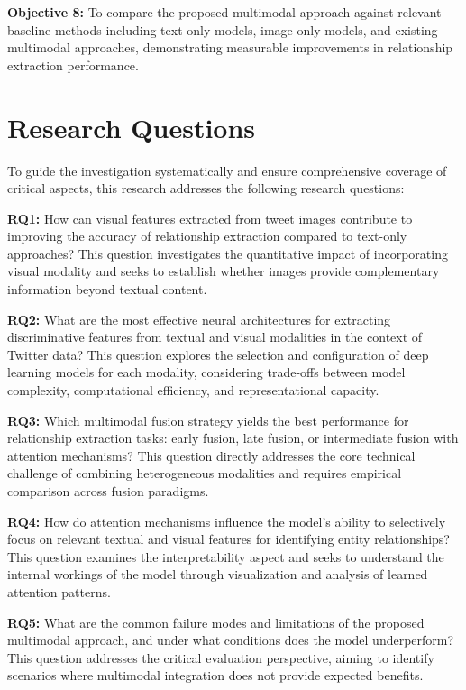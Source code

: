 \documentclass[12pt,a4paper]{report}
\begin{document}
\textbf{Objective 8:} To compare the proposed multimodal approach against relevant baseline methods including text-only models, image-only models, and existing multimodal approaches, demonstrating measurable improvements in relationship extraction performance.

\section{Research Questions}

To guide the investigation systematically and ensure comprehensive coverage of critical aspects, this research addresses the following research questions:

\textbf{RQ1:} How can visual features extracted from tweet images contribute to improving the accuracy of relationship extraction compared to text-only approaches? This question investigates the quantitative impact of incorporating visual modality and seeks to establish whether images provide complementary information beyond textual content.

\textbf{RQ2:} What are the most effective neural architectures for extracting discriminative features from textual and visual modalities in the context of Twitter data? This question explores the selection and configuration of deep learning models for each modality, considering trade-offs between model complexity, computational efficiency, and representational capacity.

\textbf{RQ3:} Which multimodal fusion strategy yields the best performance for relationship extraction tasks: early fusion, late fusion, or intermediate fusion with attention mechanisms? This question directly addresses the core technical challenge of combining heterogeneous modalities and requires empirical comparison across fusion paradigms.

\textbf{RQ4:} How do attention mechanisms influence the model's ability to selectively focus on relevant textual and visual features for identifying entity relationships? This question examines the interpretability aspect and seeks to understand the internal workings of the model through visualization and analysis of learned attention patterns.

\textbf{RQ5:} What are the common failure modes and limitations of the proposed multimodal approach, and under what conditions does the model underperform? This question addresses the critical evaluation perspective, aiming to identify scenarios where multimodal integration does not provide expected benefits.
\end{document}
